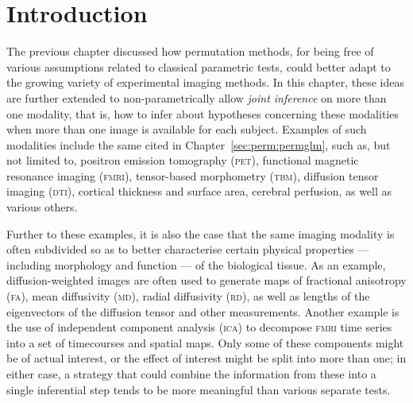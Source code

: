 \chapter{Introduction}
\setstretch{\lspac}

The previous chapter discussed how permutation methods, for being free of various assumptions related to classical parametric tests, could better adapt to the growing variety of experimental imaging methods. In this chapter, these ideas are further extended to non-parametrically allow \emph{joint inference} on more than one modality, that is, how to infer about hypotheses concerning these modalities when more than one image is available for each subject. Examples of such modalities include the same cited in Chapter~\ref{sec:perm:permglm}, such as, but not limited to, positron emission tomography (\textsc{pet}), functional magnetic resonance imaging (\textsc{fmri}), tensor-based morphometry (\textsc{tbm}), diffusion tensor imaging (\textsc{dti}), cortical thickness and surface area, cerebral perfusion, as well as various others.

Further to these examples, it is also the case that the same imaging modality is often subdivided so as to better characterise certain physical properties --- including morphology and function --- of the biological tissue. As an example, diffusion-weighted images are often used to generate maps of fractional anisotropy (\textsc{fa}), mean diffusivity (\textsc{md}), radial diffusivity (\textsc{rd}), as well as lengths of the eigenvectors of the diffusion tensor and other measurements. Another example is the use of independent component analysis (\textsc{ica}) to decompose \textsc{fmri} time series into a set of timecourses and spatial maps. Only some of these components might be of actual interest, or the effect of interest might be split into more than one; in either case, a strategy that could combine the information from these into a single inferential step tends to be more meaningful than various separate tests. \citep{Fisher1932}